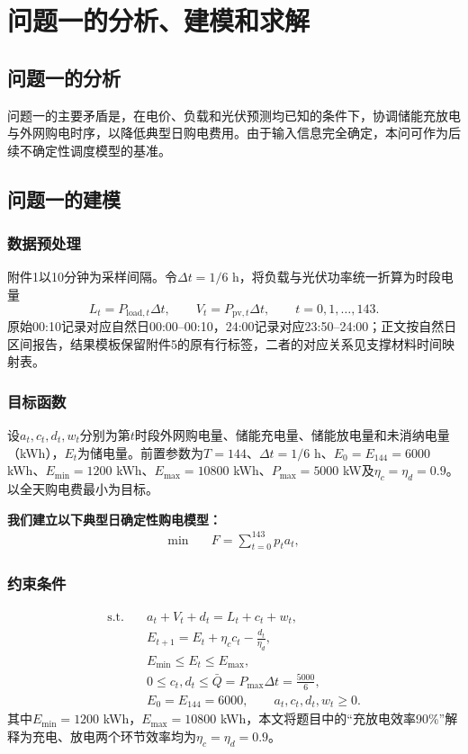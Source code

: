 \section{问题一的分析、建模和求解}

\subsection{问题一的分析}

问题一的主要矛盾是，在电价、负载和光伏预测均已知的条件下，协调储能充放电与外网购电时序，以降低典型日购电费用。由于输入信息完全确定，本问可作为后续不确定性调度模型的基准。

\subsection{问题一的建模}

\subsubsection{数据预处理}

附件1以10分钟为采样间隔。令$\Delta t=1/6$ h，将负载与光伏功率统一折算为时段电量
\begin{equation}\label{eq:src1}
L_t=P_{\mathrm{load},t}\Delta t,\qquad V_t=P_{\mathrm{pv},t}\Delta t,\qquad t=0,1,\ldots,143 .
\end{equation}
原始00:10记录对应自然日00:00--00:10，24:00记录对应23:50--24:00；正文按自然日区间报告，结果模板保留附件5的原有行标签，二者的对应关系见支撑材料时间映射表。

\subsubsection{目标函数}

设$a_t,c_t,d_t,w_t$分别为第$t$时段外网购电量、储能充电量、储能放电量和未消纳电量（kWh），$E_t$为储电量。前置参数为$T=144$、$\Delta t=1/6$ h、$E_0=E_{144}=6000$ kWh、$E_{\min}=1200$ kWh、$E_{\max}=10800$ kWh、$P_{\max}=5000$ kW及$\eta_c=\eta_d=0.9$。以全天购电费最小为目标。

\textbf{我们建立以下典型日确定性购电模型：}
\begin{align}
\min\quad &F=\sum_{t=0}^{143}p_ta_t,\label{eq:src5}
\end{align}

\subsubsection{约束条件}
\begin{align}
\mathrm{s.t.}\quad
&a_t+V_t+d_t=L_t+c_t+w_t,\label{eq:src6}\\
&
 E_{t+1}=E_t+\eta_c c_t-\frac{d_t}{\eta_d},\label{eq:src7}\\
&
 E_{\min}\le E_t\le E_{\max},\label{eq:src8}\\
&
 0\le c_t,d_t\le \bar Q=P_{\max}\Delta t=\frac{5000}{6},\label{eq:src9}\\
&
 E_0=E_{144}=6000,\qquad a_t,c_t,d_t,w_t\ge0.\label{eq:src10}
\end{align}
其中$E_{\min}=1200$ kWh，$E_{\max}=10800$ kWh，本文将题目中的“充放电效率90\%”解释为充电、放电两个环节效率均为$\eta_c=\eta_d=0.9$。

